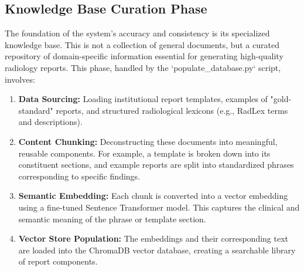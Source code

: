 \subsection{Knowledge Base Curation Phase}
The foundation of the system's accuracy and consistency is its specialized knowledge base. This is not a collection of general documents, but a curated repository of domain-specific information essential for generating high-quality radiology reports. This phase, handled by the `populate_database.py` script, involves:
\begin{enumerate}
    \item \textbf{Data Sourcing:} Loading institutional report templates, examples of "gold-standard" reports, and structured radiological lexicons (e.g., RadLex terms and descriptions).
    \item \textbf{Content Chunking:} Deconstructing these documents into meaningful, reusable components. For example, a template is broken down into its constituent sections, and example reports are split into standardized phrases corresponding to specific findings.
    \item \textbf{Semantic Embedding:} Each chunk is converted into a vector embedding using a fine-tuned Sentence Transformer model. This captures the clinical and semantic meaning of the phrase or template section.
    \item \textbf{Vector Store Population:} The embeddings and their corresponding text are loaded into the ChromaDB vector database, creating a searchable library of report components.
\end{enumerate}

